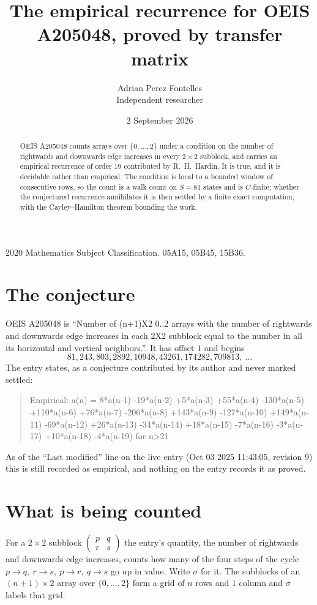 \documentclass[11pt,a4paper]{article}
\title{The empirical recurrence for OEIS A205048, proved by transfer matrix}
\author{Adrian Perez Fontelles\\ \small Independent researcher}
\date{2 September 2026}
\theoremstyle{plain}
\theoremstyle{definition}
\begin{document}
\maketitle

\begin{abstract}
OEIS A205048 counts arrays over $\{0,\dots,2\}$ under a condition on the number of rightwards and downwards edge increases
in every $2\times2$ subblock, and carries an empirical recurrence of order $19$ contributed by
R.~H.~Hardin. It is true, and it is decidable rather than empirical. The condition is local to
a bounded window of consecutive rows, so the count is a walk count on $S=81$ states and is
$C$-finite; whether the conjectured recurrence annihilates it is then settled by a finite exact
computation, with the Cayley--Hamilton theorem bounding the work.
\end{abstract}

\noindent\small 2020 Mathematics Subject Classification. 05A15, 05B45, 15B36.\normalsize

\section{The conjecture}

OEIS A205048 is ``Number of (n+1)X2 0..2 arrays with the number of rightwards and downwards edge increases in each 2X2 subblock equal to the number in all its horizontal and vertical neighbors.''. It has offset $1$ and begins
\[
81, 243, 803, 2892, 10948, 43261, 174282, 709813,\ \dots
\]
The entry states, as a conjecture contributed by its author and never marked settled:
\begin{quote}
Empirical: a(n) = 8*a(n-1) -19*a(n-2) +5*a(n-3) +55*a(n-4) -130*a(n-5) +110*a(n-6) +76*a(n-7) -206*a(n-8) +143*a(n-9) -127*a(n-10) +149*a(n-11) -69*a(n-12) +26*a(n-13) -34*a(n-14) +18*a(n-15) -7*a(n-16) -3*a(n-17) +10*a(n-18) -4*a(n-19) for n>21
\end{quote}
As of the ``Last modified'' line on the live entry (Oct 03 2025 11:43:05, revision 9) this is still
recorded as empirical, and nothing on the entry records it as proved.

\section{What is being counted}

For a $2\times2$ subblock $\begin{pmatrix}p&q\\r&s\end{pmatrix}$ the
entry's quantity, the number of rightwards and downwards edge increases, counts how many of the four steps of the cycle $p\to q,\ r\to s,\ p\to r,\ q\to s$ go up in value. Write $\sigma$ for it. The subblocks of an
$(n+1)\times2$ array over $\{0,\dots,2\}$ form a grid of $n$ rows and $1$
column and $\sigma$ labels that grid.
\end{document}
